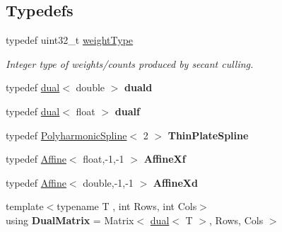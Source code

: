\subsection*{Typedefs}
\begin{DoxyCompactItemize}
\item 
\hypertarget{namespace_d_r_d_s_p_a6f6649cfc0354447bca3de04bc85e19d}{typedef uint32\-\_\-t \hyperlink{namespace_d_r_d_s_p_a6f6649cfc0354447bca3de04bc85e19d}{weight\-Type}}\label{namespace_d_r_d_s_p_a6f6649cfc0354447bca3de04bc85e19d}

\begin{DoxyCompactList}\small\item\em Integer type of weights/counts produced by secant culling. \end{DoxyCompactList}\item 
\hypertarget{namespace_d_r_d_s_p_aaf04200393245234d20ef0f7d3402237}{typedef \hyperlink{struct_d_r_d_s_p_1_1dual}{dual}$<$ double $>$ {\bfseries duald}}\label{namespace_d_r_d_s_p_aaf04200393245234d20ef0f7d3402237}

\item 
\hypertarget{namespace_d_r_d_s_p_a0a9ed0f34fa1df3afede25b5abb161d3}{typedef \hyperlink{struct_d_r_d_s_p_1_1dual}{dual}$<$ float $>$ {\bfseries dualf}}\label{namespace_d_r_d_s_p_a0a9ed0f34fa1df3afede25b5abb161d3}

\item 
\hypertarget{namespace_d_r_d_s_p_a49250c7790b7c79433a3f32fcfb23089}{typedef \hyperlink{struct_d_r_d_s_p_1_1_polyharmonic_spline}{Polyharmonic\-Spline}$<$ 2 $>$ {\bfseries Thin\-Plate\-Spline}}\label{namespace_d_r_d_s_p_a49250c7790b7c79433a3f32fcfb23089}

\item 
\hypertarget{namespace_d_r_d_s_p_a06aaf3bfc0fc56e67bce0b22df772825}{typedef \hyperlink{struct_d_r_d_s_p_1_1_affine}{Affine}$<$ float,-\/1,-\/1 $>$ {\bfseries Affine\-Xf}}\label{namespace_d_r_d_s_p_a06aaf3bfc0fc56e67bce0b22df772825}

\item 
\hypertarget{namespace_d_r_d_s_p_a4549d29ff4f8f0abe27ad69ad06e5ff2}{typedef \hyperlink{struct_d_r_d_s_p_1_1_affine}{Affine}$<$ double,-\/1,-\/1 $>$ {\bfseries Affine\-Xd}}\label{namespace_d_r_d_s_p_a4549d29ff4f8f0abe27ad69ad06e5ff2}

\item 
\hypertarget{namespace_d_r_d_s_p_afe9abf0bfaef3e2c6f7c3d258c0601e3}{{\footnotesize template$<$typename T , int Rows, int Cols$>$ }\\using {\bfseries Dual\-Matrix} = Matrix$<$ \hyperlink{struct_d_r_d_s_p_1_1dual}{dual}$<$ T $>$, Rows, Cols $>$}\label{namespace_d_r_d_s_p_afe9abf0bfaef3e2c6f7c3d258c0601e3}


\end{DoxyCompactItemize}
